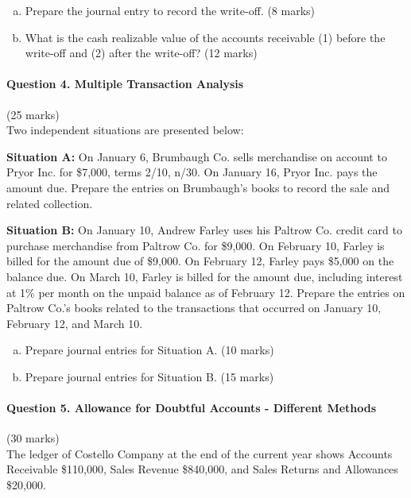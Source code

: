 \documentclass[12pt]{article}
\newcommand{\answerspace}[1]{\vspace{#1}}
\newcommand{\questionspace}{\vspace{3cm}}        %
\newcommand{\mediumanswer}{\vspace{3cm}}         %
\newcommand{\journalspace}{\vspace{4.5cm}}       %
\begin{document}
\begin{enumerate}[(a)]
    \item Prepare the journal entry to record the write-off. \hfill (8 marks)
    
    \journalspace
    
    \item What is the cash realizable value of the accounts receivable (1) before the write-off and (2) after the write-off? \hfill (12 marks)
    
    \mediumanswer
\end{enumerate}

\newpage
\paragraph{Question 4. Multiple Transaction Analysis}\hfill (25 marks)\\
Two independent situations are presented below:

\textbf{Situation A:} On January 6, Brumbaugh Co. sells merchandise on account to Pryor Inc. for \$7,000, terms 2/10, n/30. On January 16, Pryor Inc. pays the amount due. Prepare the entries on Brumbaugh's books to record the sale and related collection.

\textbf{Situation B:} On January 10, Andrew Farley uses his Paltrow Co. credit card to purchase merchandise from Paltrow Co. for \$9,000. On February 10, Farley is billed for the amount due of \$9,000. On February 12, Farley pays \$5,000 on the balance due. On March 10, Farley is billed for the amount due, including interest at 1\% per month on the unpaid balance as of February 12. Prepare the entries on Paltrow Co.'s books related to the transactions that occurred on January 10, February 12, and March 10.

\begin{enumerate}[(a)]
    \item Prepare journal entries for Situation A. \hfill (10 marks)
    
    \journalspace
    
    \item Prepare journal entries for Situation B. \hfill (15 marks)
    
    \answerspace{6cm}
\end{enumerate}

\questionspace
\paragraph{Question 5. Allowance for Doubtful Accounts - Different Methods}\hfill (30 marks)\\
The ledger of Costello Company at the end of the current year shows Accounts Receivable \$110,000, Sales Revenue \$840,000, and Sales Returns and Allowances \$20,000.
\end{document}
